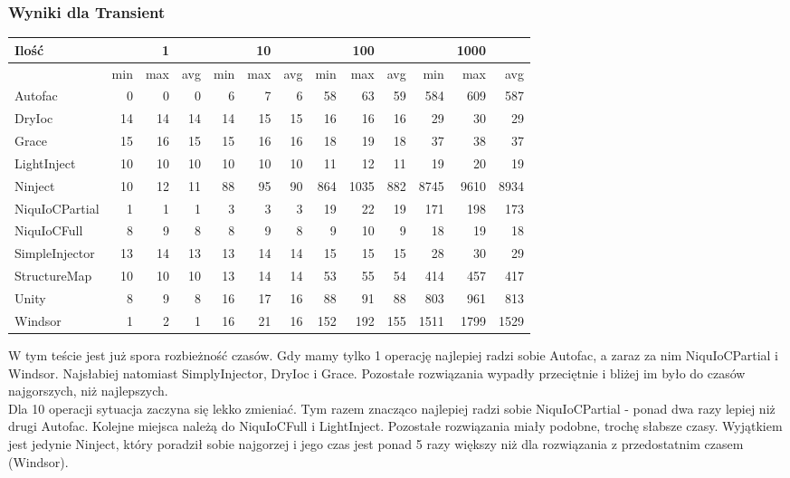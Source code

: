\documentclass[12pt]{article}
\begin{document}
\subsubsection{Wyniki dla Transient}
\begin{center}
\begin{small}
	\begin{tabular}{ | l | r r r | r r r | r r r | r r r | }
    		\hline
Ilość & & 1 & & & 10 & & & 100 & & & 1000 & \\ \hline
 & min & max & avg & min & max & avg & min & max & avg & min & max & avg \\ \hline
Autofac & 0 & 0 & 0 & 6 & 7 & 6 & 58 & 63 & 59 & 584 & 609 & 587 \\ \hline
DryIoc & 14 & 14 & 14 & 14 & 15 & 15 & 16 & 16 & 16 & 29 & 30 & 29 \\ \hline
Grace & 15 & 16 & 15 & 15 & 16 & 16 & 18 & 19 & 18 & 37 & 38 & 37 \\ \hline
LightInject & 10 & 10 & 10 & 10 & 10 & 10 & 11 & 12 & 11 & 19 & 20 & 19 \\ \hline
Ninject & 10 & 12 & 11 & 88 & 95 & 90 & 864 & 1035 & 882 & 8745 & 9610 & 8934 \\ \hline
NiquIoCPartial & 1 & 1 & 1 & 3 & 3 & 3 & 19 & 22 & 19 & 171 & 198 & 173 \\ \hline
NiquIoCFull & 8 & 9 & 8 & 8 & 9 & 8 & 9 & 10 & 9 & 18 & 19 & 18 \\ \hline
SimpleInjector & 13 & 14 & 13 & 13 & 14 & 14 & 15 & 15 & 15 & 28 & 30 & 29 \\ \hline
StructureMap & 10 & 10 & 10 & 13 & 14 & 14 & 53 & 55 & 54 & 414 & 457 & 417 \\ \hline
Unity & 8 & 9 & 8 & 16 & 17 & 16 & 88 & 91 & 88 & 803 & 961 & 813 \\ \hline
Windsor & 1 & 2 & 1 & 16 & 21 & 16 & 152 & 192 & 155 & 1511 & 1799 & 1529 \\ \hline
  	\end{tabular}
\end{small}
\end{center}
W tym teście jest już spora rozbieżność czasów. Gdy mamy tylko 1 operację najlepiej radzi sobie Autofac, a zaraz za nim NiquIoCPartial i Windsor. Najsłabiej natomiast SimplyInjector, DryIoc i Grace. Pozostałe rozwiązania wypadły przeciętnie i bliżej im było do czasów najgorszych, niż najlepszych.\\
Dla 10 operacji sytuacja zaczyna się lekko zmieniać. Tym razem znacząco najlepiej radzi sobie NiquIoCPartial - ponad dwa razy lepiej niż drugi Autofac. Kolejne miejsca należą do NiquIoCFull i LightInject. Pozostałe rozwiązania miały podobne, trochę słabsze czasy. Wyjątkiem jest jedynie Ninject, który poradził sobie najgorzej i jego czas jest ponad 5 razy większy niż dla rozwiązania z przedostatnim czasem (Windsor).\\
\end{document}
